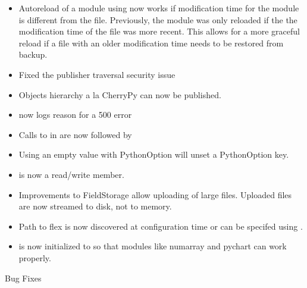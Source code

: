   \begin{itemize}
    \item
      Autoreload of a module using  now works if
      modification time for the module is different from the file.
      Previously, the module was only reloaded if the the modification 
      time of the file was more recent. This allows for a more graceful
      reload if a file with an older modification time needs to be
      restored from backup.
    \item
      Fixed the publisher traversal security issue
    \item
      Objects hierarchy a la CherryPy can now be published.
    \item
       now logs reason for a 500 error
    \item
      Calls to  in  are now followed by 
    \item
      Using an empty value with PythonOption will unset a PythonOption key.
    \item
       is now a read/write member.
    \item
      Improvements to FieldStorage allow uploading of large files. Uploaded
      files are now streamed to disk, not to memory.
    \item
      Path to flex is now discovered at configuration time or can be
      specifed using .
    \item
       is now initialized to  so that modules
      like numarray and pychart can work properly.
  \end{itemize}

  Bug Fixes

